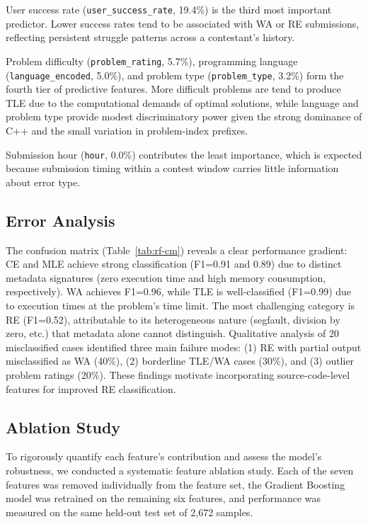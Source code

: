 \documentclass[10pt,letterpaper]{article}
\begin{document}
User success rate (\texttt{user\_success\_rate}, 19.4\%) is the third most
important predictor. Lower success rates tend to be associated with WA or RE
submissions, reflecting persistent struggle patterns across a contestant's
history.

Problem difficulty (\texttt{problem\_rating}, 5.7\%), programming language
(\texttt{language\_encoded}, 5.0\%), and problem type (\texttt{problem\_type},
3.2\%) form the fourth tier of predictive features. More difficult problems are
tend to produce TLE due to the computational demands of optimal
solutions, while language and problem type provide modest discriminatory power
given the strong dominance of C++ and the small variation in problem-index
prefixes.

Submission hour (\texttt{hour}, 0.0\%) contributes the least importance, which
is expected because submission timing within a contest window carries little
information about error type.


\subsection{Error Analysis}

The confusion matrix (Table~\ref{tab:rf-cm}) reveals a clear performance gradient: CE and MLE achieve strong classification (F1=0.91 and 0.89) due to distinct metadata signatures (zero execution time and high memory consumption, respectively). WA achieves F1=0.96, while TLE is well-classified (F1=0.99) due to execution times at the problem's time limit. The most challenging category is RE (F1=0.52), attributable to its heterogeneous nature (segfault, division by zero, etc.) that metadata alone cannot distinguish. Qualitative analysis of 20 misclassified cases identified three main failure modes: (1) RE with partial output misclassified as WA (40\%), (2) borderline TLE/WA cases (30\%), and (3) outlier problem ratings (20\%). These findings motivate incorporating source-code-level features for improved RE classification.

\subsection{Ablation Study}
\label{sec:ablation}

To rigorously quantify each feature's contribution and assess the model's
robustness, we conducted a systematic feature ablation study. Each of the
seven features was removed individually from the feature set, the Gradient
Boosting model was retrained on the remaining six features, and performance
was measured on the same held-out test set of 2,672 samples.
\end{document}
